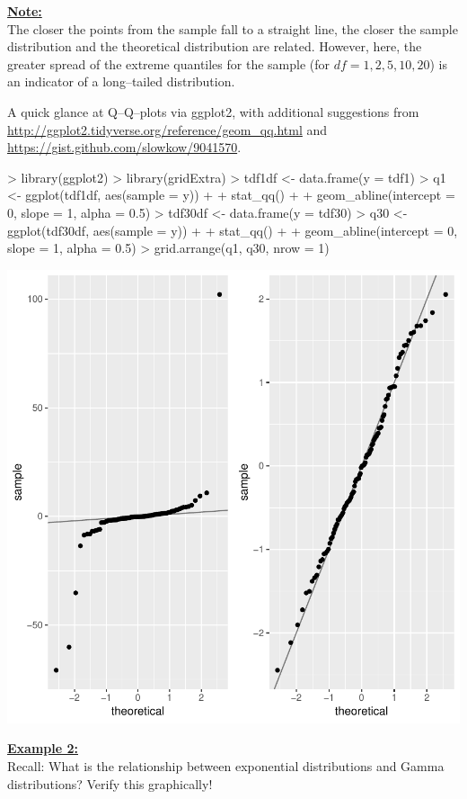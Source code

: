 \documentclass[12pt,letterpaper,final]{article}
\begin{document}
\noindent
\underline{\bf Note:} \\
The closer the points from the sample fall to a straight line,
the closer the sample distribution and the theoretical distribution
are related. However, here, the greater spread of the extreme quantiles
for the sample (for $df = 1, 2, 5, 10, 20$)
is an indicator of a long--tailed distribution.


A quick glance at Q--Q--plots via ggplot2, with additional suggestions from
\url{http://ggplot2.tidyverse.org/reference/geom_qq.html} and
\url{https://gist.github.com/slowkow/9041570}.

\begin{Schunk}
\begin{Sinput}
> library(ggplot2)
> library(gridExtra)
> tdf1df <- data.frame(y = tdf1)
> q1 <- ggplot(tdf1df, aes(sample = y)) +
+   stat_qq() +
+   geom_abline(intercept = 0, slope = 1, alpha = 0.5)
> tdf30df <- data.frame(y = tdf30)
> q30 <- ggplot(tdf30df, aes(sample = y)) +
+   stat_qq() +
+   geom_abline(intercept = 0, slope = 1, alpha = 0.5)
> grid.arrange(q1, q30, nrow = 1)
\end{Sinput}
\end{Schunk}
\includegraphics{lect_main-032}


\noindent
\underline{\bf Example 2:} \\
Recall: What is the relationship between exponential
distributions and Gamma distributions? Verify this graphically!
\end{document}
